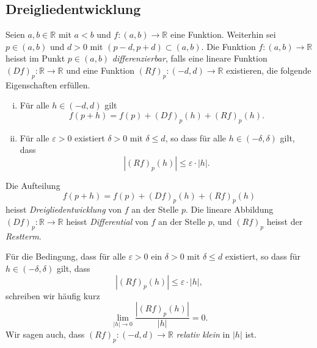 \documentclass[../main.tex]{subfiles}
\begin{document}
\subsection*{Dreigliedentwicklung}
\begin{definition}
  Seien $a, b \in \mathbb{R}$
  mit $a < b$ und
  $f \colon (a, b) \to \mathbb{R}$
  eine Funktion.
  Weiterhin sei $p \in (a, b)$ und
  $d > 0$
  mit $(p - d, p + d) \subset (a, b)$.
  Die Funktion $f \colon (a, b) \to \mathbb{R}$
  heisst im Punkt
  $p \in (a, b)$ \emph{differenzierbar},
  falls eine lineare Funktion
  ${(Df)}_p \colon\mathbb{R} \to \mathbb{R}$
  und eine Funktion ${(Rf)}_p \colon (-d, d) \to \mathbb{R}$
  existieren, die folgende Eigenschaften erfüllen.
  \begin{enumerate}[(i)]
    \item Für alle $h \in (-d, d)$ gilt
      \[
        f(p + h) = f(p) + {(Df)}_p(h) + {(Rf)}_p(h).
      \]
    \item Für alle $\varepsilon > 0$ existiert
      $\delta > 0$ mit $\delta \leq d$, so dass
      für alle $h \in (- \delta, \delta)$ gilt,
      dass
      \[
        |{(Rf)}_p(h)| \leq \varepsilon \cdot |h|.
      \]
   \end{enumerate}
   Die Aufteilung
   \[
     f(p + h) = f(p) + {(Df)}_p(h) + {(Rf)}_p(h)
   \]
   heisst \emph{Dreigliedentwicklung} von $f$
   an der Stelle $p$.
   Die lineare Abbildung
   ${(Df)}_p \colon\mathbb{R} \to \mathbb{R}$ heisst
   \emph{Differential} von $f$ an der Stelle $p$,
   und ${(Rf)}_p$ heisst der \emph{Restterm}.
\end{definition}

Für die Bedingung, dass für
alle $\varepsilon > 0$ ein $\delta > 0$
mit $\delta \leq d$ existiert,
so dass für $h \in (-\delta, \delta)$ gilt,
dass
\[
  |{(Rf)}_p(h)| \leq \varepsilon \cdot |h|,
\]
schreiben wir häufig kurz
\[
  \lim_{|h| \to 0} \frac{|{(Rf)}_p(h)|}{|h|} = 0.
\]
Wir sagen auch, dass ${(Rf)}_p \colon (-d, d) \to \mathbb{R}$ \emph{relativ klein}
in $|h|$ ist.
\end{document}
